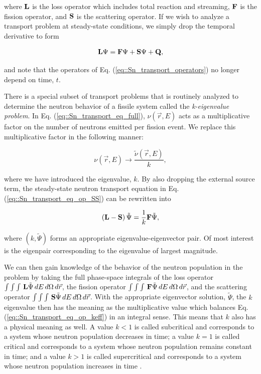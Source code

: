 \noindent where ${\bf L}$ is the loss operator which includes total reaction and streaming, ${\bf F}$ is the fission operator, and ${\bf S}$ is the scattering operator. If we wish to analyze a transport problem at steady-state conditions, we simply drop the temporal derivative to form

\begin{equation}
\label{eq::Sn_transport_eq_op_SS}
	 {\bf L} \Psi =  {\bf F} \Psi  + {\bf S} \Psi + {\bf Q},
\end{equation}

\noindent and note that the operators of Eq. (\ref{eq::Sn_transport_operators}) no longer depend on time, $t$.

There is a special subset of transport problems that is routinely analyzed to determine the neutron behavior of a fissile system called the {\em k-eigenvalue problem}. In Eq. (\ref{eq::Sn_transport_eq_full}), $\nu (\vec{r}, E)$ acts as a multiplicative factor on the number of neutrons emitted per fission event. We replace this multiplicative factor in the following manner:

\begin{equation}
\label{eq::Sn_nubar_k}
	\nu (\vec{r}, E) \rightarrow \frac{\tilde{\nu} (\vec{r}, E)}{k},
\end{equation}

\noindent where we have introduced the eigenvalue, $k$. By also dropping the external source term, the steady-state neutron transport equation in Eq. (\ref{eq::Sn_transport_eq_op_SS}) can be rewritten into

\begin{equation}
\label{eq::Sn_transport_eq_op_keff}
	\left( {\bf L}  - {\bf S} \right) \tilde{\Psi} =  \frac{1}{k} {\bf F} \tilde{\Psi} ,
\end{equation}

\noindent where $(k, \tilde{\Psi})$ forms an appropriate eigenvalue-eigenvector pair. Of most interest is the eigenpair corresponding to the eigenvalue of largest magnitude.

We can then gain knowledge of the behavior of the neutron population in the problem by taking the full phase-space integrals of the loss operator $\int  \int \int \, {\bf L} \tilde{\Psi} \, dE \, d\Omega \, d\vec{r}$, the fission operator $\int  \int \int \, {\bf F} \tilde{\Psi} \, dE \, d\Omega \, d\vec{r}$, and the scattering operator $\int  \int \int \, {\bf S} \tilde{\Psi} \, dE \, d\Omega \, d\vec{r}$. With the appropriate eigenvector solution, $\tilde{\Psi}$, the $k$ eigenvalue then has the meaning as the multiplicative value which balances Eq. (\ref{eq::Sn_transport_eq_op_keff}) in an integral sense. This means that $k$ also has a physical meaning as well. A value $k<1$ is called subcritical and corresponds to a system whose neutron population decreases in time; a value $k=1$ is called critical and corresponds to a system whose neutron population remains constant in time; and a value $k>1$ is called supercritical and corresponds to a system whose neutron population increases in time \cite{ott1989}.


